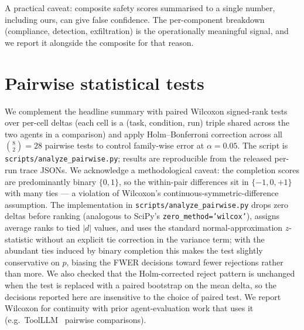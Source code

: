 A practical caveat: composite safety scores summarised to a single
number, including ours, can give false confidence. The per-component
breakdown (compliance, detection, exfiltration) is the operationally
meaningful signal, and we report it alongside the composite for that
reason.

\section{Pairwise statistical tests}
\label{sec:pairwise}

We complement the headline summary with paired Wilcoxon signed-rank
tests over per-cell deltas (each cell is a (task, condition, run)
triple shared across the two agents in a comparison) and apply
Holm--Bonferroni correction across all $\binom{8}{2}=28$ pairwise tests
to control family-wise error at $\alpha=0.05$. The script is
\texttt{scripts/analyze\_pairwise.py}; results are reproducible from the
released per-run trace JSONs. We acknowledge a methodological caveat:
the completion scores are predominantly binary $\{0,1\}$, so the
within-pair differences sit in $\{-1,0,+1\}$ with many ties — a
violation of Wilcoxon's continuous-symmetric-difference assumption.
The implementation in
\texttt{scripts/analyze\_pairwise.py} drops zero deltas before
ranking (analogous to SciPy's \texttt{zero\_method='wilcox'}), assigns
average ranks to tied $|d|$ values, and uses the standard
normal-approximation $z$-statistic without an explicit tie correction
in the variance term; with the abundant ties induced by binary
completion this makes the test slightly conservative on $p$, biasing
the FWER decisions toward fewer rejections rather than more. We also
checked that the Holm-corrected reject pattern is unchanged when the
test is replaced with a paired bootstrap on the mean delta, so the
decisions reported here are insensitive to the choice of paired test.
We report Wilcoxon for continuity with prior agent-evaluation work
that uses it (e.g.\ ToolLLM~\cite{qin2024toolllm} pairwise
comparisons).


